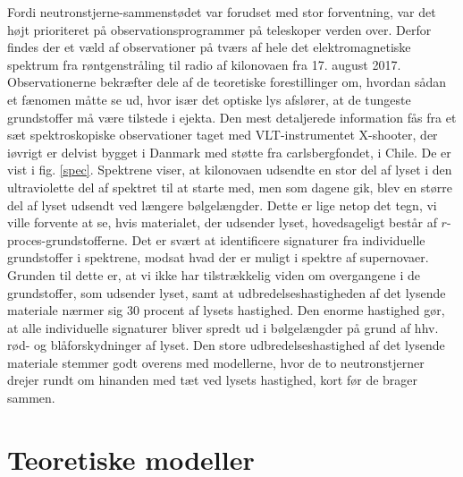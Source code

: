 \documentclass[twocolumn]{article}
\begin{document}
Fordi neutronstjerne-sammenstødet var forudset med stor forventning, var det højt prioriteret på observationsprogrammer på teleskoper verden over. Derfor findes der et væld af observationer på tværs af hele det elektromagnetiske spektrum fra røntgenstråling til radio af kilonovaen fra 17. august 2017. Observationerne bekræfter dele af de teoretiske forestillinger om, hvordan sådan et fænomen måtte se ud, hvor især det optiske lys afslører, at de tungeste grundstoffer må være tilstede i ejekta. Den mest detaljerede information fås fra et sæt spektroskopiske observationer taget med VLT-instrumentet X-shooter, der iøvrigt er delvist bygget i Danmark med støtte fra carlsbergfondet, i Chile. De er vist i fig. \ref{spec}. Spektrene viser, at kilonovaen udsendte en stor del af lyset i den ultraviolette del af spektret til at starte med, men som dagene gik, blev en større del af lyset udsendt ved længere bølgelængder. Dette er lige netop det tegn, vi ville forvente at se, hvis materialet, der udsender lyset, hovedsageligt består af $r$-proces-grundstofferne. Det er svært at identificere signaturer fra individuelle grundstoffer i spektrene, modsat hvad der er muligt i spektre af supernovaer. Grunden til dette er, at vi ikke har tilstrækkelig viden om overgangene i de grundstoffer, som udsender lyset, samt at udbredelseshastigheden af det lysende materiale nærmer sig 30 procent af lysets hastighed. Den enorme hastighed gør, at alle individuelle signaturer bliver spredt ud i bølgelængder på grund af hhv. rød- og blåforskydninger af lyset. Den store udbredelseshastighed af det lysende materiale stemmer godt overens med modellerne, hvor de to neutronstjerner drejer rundt om hinanden med tæt ved lysets hastighed, kort før de brager sammen.


\section{Teoretiske modeller}\label{teo}
\end{document}
